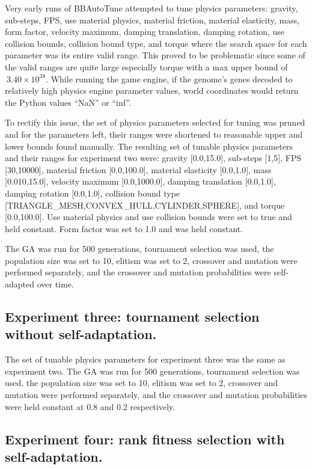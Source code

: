 Very early runs of BBAutoTune attempted to tune physics parameters: gravity, sub-steps, FPS, use material physics, material friction, material elasticity, mass, form factor, velocity maximum, damping translation, damping rotation, use collision bounds, collision bound type, and torque where the search space for each parameter was its entire valid range. This proved to be problematic since some of the valid ranges are quite large especially torque with a max upper bound of $~3.40\times10^{38}$. While running the game engine, if the genome's genes decoded to relatively high physics engine parameter values, world coordinates would return the Python values ``NaN'' or ``inf''.

To rectify this issue, the set of physics parameters selected for tuning was pruned and for the parameters left, their ranges were shortened to reasonable upper and lower bounds found manually. The resulting set of tunable physics parameters and their ranges for experiment two were: gravity [0.0,15.0], sub-steps [1,5], FPS [30,10000], material friction [0.0,100.0], material elasticity [0.0,1.0], mass [0.010,15.0], velocity maximum [0.0,1000.0], damping translation [0.0,1.0], damping rotation [0.0,1.0], collision bound type [TRIANGLE\_MESH,CONVEX\_HULL,CYLINDER,SPHERE], and torque [0.0,100.0]. Use material physics and use collision bounds were set to true and held constant. Form factor was set to 1.0 and was held constant. 

The GA was run for 500 generations, tournament selection was used, the population size was set to 10, elitism was set to 2, crossover and mutation were performed separately, and the crossover and mutation probabilities were self-adapted over time.

\subsection[Experiment Three]{Experiment three: tournament selection without self-adaptation.}

The set of tunable physics parameters for experiment three was the same as experiment two. The GA was run for 500 generations, tournament selection was used, the population size was set to 10, elitism was set to 2, crossover and mutation were performed separately, and the crossover and mutation probabilities were held constant at 0.8 and 0.2 respectively.

\subsection[Experiment Four]{Experiment four: rank fitness selection with self-adaptation.}

